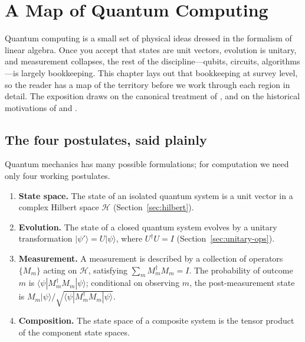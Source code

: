 \chapter{A Map of Quantum Computing}


Quantum computing is a small set of physical ideas dressed in the formalism of linear algebra. Once you accept that states are unit vectors, evolution is unitary, and measurement collapses, the rest of the discipline---qubits, circuits, algorithms---is largely bookkeeping. This chapter lays out that bookkeeping at survey level, so the reader has a map of the territory before we work through each region in detail. The exposition draws on the canonical treatment of \citet{nielsen_quantum_2010}, and on the historical motivations of \citet{feynman_simulating_1982} and \citet{deutsch_quantum_1985}.

\section{The four postulates, said plainly}

Quantum mechanics has many possible formulations; for computation we need only four working postulates.

\begin{enumerate}
\item \textbf{State space.} The state of an isolated quantum system is a unit vector in a complex Hilbert space $\mathcal{H}$ (Section~\ref{sec:hilbert}).
\item \textbf{Evolution.} The state of a closed quantum system evolves by a unitary transformation $|\psi'\rangle = U|\psi\rangle$, where $U^\dagger U = I$ (Section~\ref{sec:unitary-ops}).
\item \textbf{Measurement.} A measurement is described by a collection of operators $\{M_m\}$ acting on $\mathcal{H}$, satisfying $\sum_m M_m^\dagger M_m = I$. The probability of outcome $m$ is $\langle\psi|M_m^\dagger M_m|\psi\rangle$; conditional on observing $m$, the post-measurement state is $M_m|\psi\rangle/\sqrt{\langle\psi|M_m^\dagger M_m|\psi\rangle}$.
\item \textbf{Composition.} The state space of a composite system is the tensor product of the component state spaces.
\end{enumerate}

